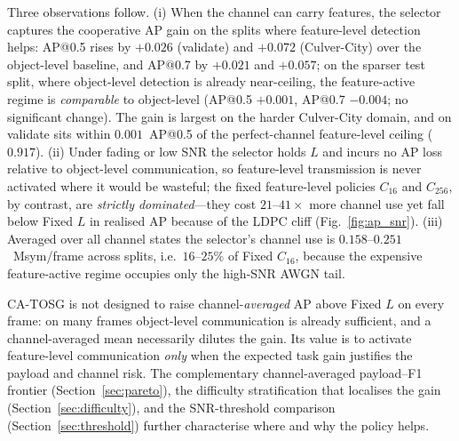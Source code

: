 \documentclass[journal]{IEEEtran}
\newcommand{\method}{CA-TOSG}
\begin{document}
Three observations follow. (i) When the channel can carry features, the selector captures the cooperative AP gain on the splits where feature-level detection helps: AP@0.5 rises by $+0.026$ (validate) and $+0.072$ (Culver-City) over the object-level baseline, and AP@0.7 by $+0.021$ and $+0.057$; on the sparser test split, where object-level detection is already near-ceiling, the feature-active regime is \emph{comparable} to object-level (AP@0.5 $+0.001$, AP@0.7 $-0.004$; no significant change). The gain is largest on the harder Culver-City domain, and on validate sits within $0.001$~AP@0.5 of the perfect-channel feature-level ceiling ($0.917$). (ii) Under fading or low SNR the selector holds $L$ and incurs no AP loss relative to object-level communication, so feature-level transmission is never activated where it would be wasteful; the fixed feature-level policies $C_{16}$ and $C_{256}$, by contrast, are \emph{strictly dominated}---they cost $21\text{--}41\times$ more channel use yet fall below Fixed $L$ in realised AP because of the LDPC cliff (Fig.~\ref{fig:ap_snr}). (iii) Averaged over all channel states the selector's channel use is $0.158$--$0.251$~Msym/frame across splits, i.e.\ $16$--$25\%$ of Fixed $C_{16}$, because the expensive feature-active regime occupies only the high-SNR AWGN tail.

\method{} is not designed to raise channel-\emph{averaged} AP above Fixed $L$ on every frame: on many frames object-level communication is already sufficient, and a channel-averaged mean necessarily dilutes the gain. Its value is to activate feature-level communication \emph{only} when the expected task gain justifies the payload and channel risk. The complementary channel-averaged payload--F1 frontier (Section~\ref{sec:pareto}), the difficulty stratification that localises the gain (Section~\ref{sec:difficulty}), and the SNR-threshold comparison (Section~\ref{sec:threshold}) further characterise where and why the policy helps.
\end{document}

